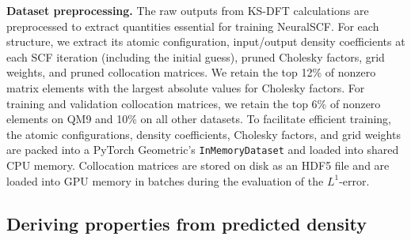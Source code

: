 \documentclass[%
reprint,
superscriptaddress,
bibnotes,
amsmath,amssymb,
aps,
floatfix, %
]{revtex4-2}
\begin{document}
\vspace{\baselineskip}
\noindent\textbf{Dataset preprocessing.} The raw outputs from KS-DFT calculations are preprocessed to extract quantities essential for training NeuralSCF. For each structure, we extract its atomic configuration, input/output density coefficients at each SCF iteration (including the initial guess), pruned Cholesky factors, grid weights, and pruned collocation matrices. We retain the top 12\% of nonzero matrix elements with the largest absolute values for Cholesky factors. For training and validation collocation matrices, we retain the top 6\% of nonzero elements on QM9 and 10\% on all other datasets. To facilitate efficient training, the atomic configurations, density coefficients, Cholesky factors, and grid weights are packed into a PyTorch Geometric's \cite{fey2019pyg} \texttt{InMemoryDataset} and loaded into shared CPU memory. Collocation matrices are stored on disk as an HDF5 file and are loaded into GPU memory in batches during the evaluation of the $L^1$-error.

\subsection{\label{sec:extra}Deriving properties from predicted density}
\end{document}
